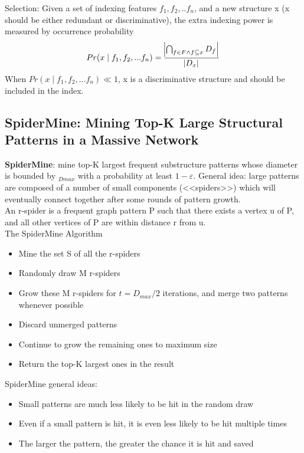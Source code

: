 Selection: Given a set of indexing features $f_1, f_2, .. f_n$, and a new structure x (x should be either redundant or discriminative), the extra indexing power is measured by occurrence probability 
\begin{equation*}
Pr(x \mid f_1,f_2,...f_n) = \frac{\abs{\bigcap_{f \in F \wedge f \subseteq x}D_f}}{\abs{D_x}}
\end{equation*}
When $Pr(x \mid f_1,f_2,...f_n) \ll 1$, x is a discriminative structure and should be included in the index.

\subsection{SpiderMine: Mining Top-K Large Structural Patterns in a Massive Network}
\textbf{SpiderMine}: mine top-K largest frequent substructure patterns whose diameter is bounded by $_{Dmax}$ with a probability at least $1− \varepsilon$. General idea: large patterns are composed of a number of small components (<<spiders>>) which will eventually connect together after some rounds of pattern growth.\\

An r-spider is a frequent graph pattern P such that there exists a vertex u of P, and all other vertices of P are within distance r from u.\\

The SpiderMine Algorithm
\begin{itemize}
\item Mine the set S of all the r-spiders
\item Randomly draw M r-spiders
\item Grow these M r-spiders for $t = D_{max}/2$ iterations, and merge two patterns whenever possible
\item Discard unmerged patterns
\item Continue to grow the remaining ones to maximum size
\item Return the top-K largest ones in the result
\end{itemize}

SpiderMine general ideas:
\begin{itemize}
\item Small patterns are much less likely to be hit in the random draw
\item Even if a small pattern is hit, it is even less likely to be hit multiple times 
\item The larger the pattern, the greater the chance it is hit and saved
\end{itemize}


